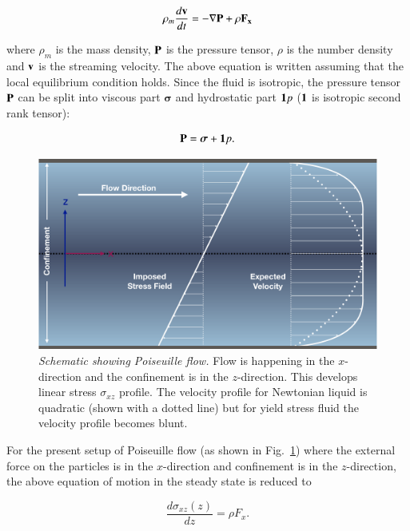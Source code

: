     \begin{equation}
    \rho_{m} \frac{d{\bf v}}{dt} = -\nabla {\bf P} + \rho {\bf F_x}
    \end{equation}
    
    where $\rho_m$ is the mass density, ${\bf P}$ is the pressure tensor, $\rho$ is the number density and ${\bf v}$ is the streaming velocity. The above equation is written assuming that the local equilibrium condition holds. Since the fluid is isotropic, the pressure tensor ${\bf P}$ can be split into viscous part $\boldsymbol{\sigma}$ and hydrostatic part ${\bf 1} p$ (${\bf 1}$ is isotropic second rank tensor):
 
    \begin{equation}
     {\bf P} = \boldsymbol{\sigma} + {\bf 1} p.
    \end{equation}
    
    \begin{figure}[hbt!]
	\includegraphics[width=14cm]{figs/poiseuilleFlow.pdf}
	\centering
	\caption[{\em Schematic showing Poiseuille flow}]{{\em Schematic showing Poiseuille flow.} Flow is happening in the $x$-direction and the confinement is in the $z$-direction. This develops linear stress $\sigma_{xz}$ profile. The velocity profile for Newtonian liquid is quadratic (shown with a dotted line) but for yield stress fluid the velocity profile becomes blunt. \label{fig_poiseuille}}
    \end{figure}
 
    For the present setup of Poiseuille flow (as shown in Fig.~\ref{fig_poiseuille}) where the external force on the particles is in the $x$-direction and confinement is in the $z$-direction, the above equation of motion in the steady state is reduced to

    \begin{equation}
    \frac{d\sigma_{xz}(z)}{dz} = \rho F_x.
    \label{stressEq}
    \end{equation}

